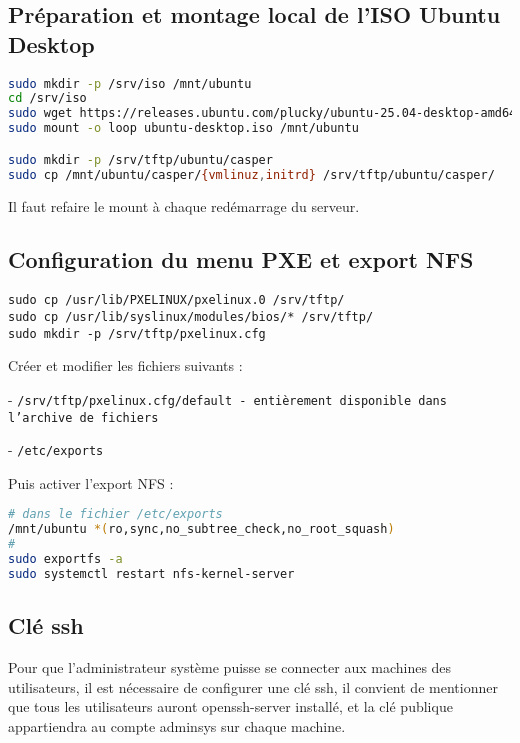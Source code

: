 \documentclass[a4paper,12pt]{article}
\begin{document}
\subsection{Préparation et montage local de l'ISO Ubuntu Desktop}

\begin{lstlisting}[language=bash]
sudo mkdir -p /srv/iso /mnt/ubuntu
cd /srv/iso
sudo wget https://releases.ubuntu.com/plucky/ubuntu-25.04-desktop-amd64.iso -O ubuntu-desktop.iso
sudo mount -o loop ubuntu-desktop.iso /mnt/ubuntu 

sudo mkdir -p /srv/tftp/ubuntu/casper
sudo cp /mnt/ubuntu/casper/{vmlinuz,initrd} /srv/tftp/ubuntu/casper/
\end{lstlisting}
Il faut refaire le mount à chaque redémarrage du serveur.

\subsection{Configuration du menu PXE et export NFS}
\begin{lstlisting}
sudo cp /usr/lib/PXELINUX/pxelinux.0 /srv/tftp/
sudo cp /usr/lib/syslinux/modules/bios/* /srv/tftp/
sudo mkdir -p /srv/tftp/pxelinux.cfg    
\end{lstlisting}
Créer et modifier les fichiers suivants :

- \texttt{/srv/tftp/pxelinux.cfg/default - entièrement disponible dans l'archive de fichiers}

- \texttt{/etc/exports}

Puis activer l’export NFS :

\begin{lstlisting}[language=bash]
# dans le fichier /etc/exports
/mnt/ubuntu *(ro,sync,no_subtree_check,no_root_squash)
#
sudo exportfs -a
sudo systemctl restart nfs-kernel-server
\end{lstlisting}

\subsection{Clé ssh}
Pour que l'administrateur système puisse se connecter aux machines des utilisateurs, il est nécessaire de configurer une clé ssh, il convient de mentionner que tous les utilisateurs auront openssh-server installé, et la clé publique appartiendra au compte adminsys sur chaque machine.
\end{document}
